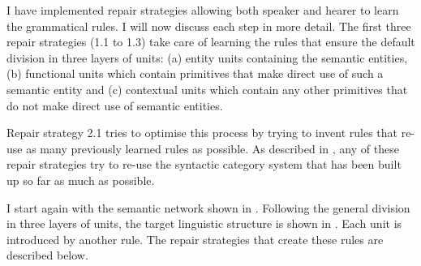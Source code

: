 I have implemented repair strategies allowing both speaker and hearer to
learn the grammatical rules. I will now discuss each step in more
detail. The first three repair strategies (1.1 to 1.3) take care of
learning the rules that ensure the default division in three layers of
units: (a) entity units containing the semantic entities, (b)
functional units which contain primitives that make direct use of such
a semantic entity and (c) contextual units which contain any other
primitives that do not make direct use of semantic entities.

Repair strategy 2.1 tries to optimise this process by trying to invent rules
that re-use as many previously learned rules as possible. As described
in , any of
these repair strategies try to re-use the syntactic category system
that has been built up so far as much as possible.

I start again with the semantic network shown in . Following the general division in three layers
of units, the target linguistic structure is shown in . Each unit is introduced by another rule. The
repair strategies that create these rules are described below.

